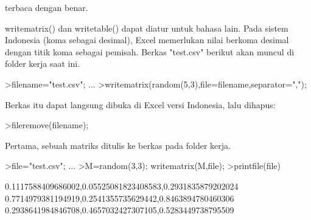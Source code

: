 \documentclass[a4paper,10pt]{article}
\begin{document}
\begin{eulernotebook}
\begin{eulercomment}
\begin{eulercomment}
\begin{eulercomment}
\begin{eulercomment}
\begin{eulercomment}
\begin{eulercomment}
\begin{eulercomment}
\begin{eulercomment}
\begin{eulercomment}
\begin{eulercomment}
\begin{eulercomment}
\begin{eulercomment}
\begin{eulercomment}
\begin{eulercomment}
\begin{eulercomment}
\begin{eulercomment}
\begin{eulercomment}
\begin{eulercomment}
\begin{eulercomment}
\begin{eulercomment}
\begin{eulercomment}
\begin{eulercomment}
\begin{eulercomment}
\begin{eulercomment}
\begin{eulercomment}
\begin{eulercomment}
\begin{eulercomment}
terbaca dengan benar.

writematrix() dan writetable() dapat diatur untuk bahasa lain. Pada sistem Indonesia (koma
sebagai desimal), Excel memerlukan nilai berkoma desimal dengan titik koma sebagai pemisah.
Berkas "test.csv" berikut akan muncul di folder kerja saat ini.
\end{eulercomment}
\begin{eulerprompt}
>filename="test.csv"; ...
>writematrix(random(5,3),file=filename,separator=",");
\end{eulerprompt}
\begin{eulercomment}
Berkas itu dapat langsung dibuka di Excel versi Indonesia, lalu dihapus:
\end{eulercomment}
\begin{eulerprompt}
>fileremove(filename);
\end{eulerprompt}
\begin{eulercomment}
\end{eulercomment}
\begin{eulercomment}
Pertama, sebuah matriks ditulis ke berkas pada folder kerja.
\end{eulercomment}
\begin{eulerprompt}
>file="test.csv";  ...
>M=random(3,3); writematrix(M,file);
>printfile(file)
\end{eulerprompt}
\begin{euleroutput}
  0.1117588409686002,0.05525081823408583,0.2931835879202024
  0.7714979381194919,0.2541355735629442,0.8463894780460306
  0.2938641984846708,0.4657032427307105,0.5283449738795509
  

\end{euleroutput}
\end{eulercomment}
\end{eulercomment}
\end{eulercomment}
\end{eulercomment}
\end{eulercomment}
\end{eulercomment}
\end{eulercomment}
\end{eulercomment}
\end{eulercomment}
\end{eulercomment}
\end{eulercomment}
\end{eulercomment}
\end{eulercomment}
\end{eulercomment}
\end{eulercomment}
\end{eulercomment}
\end{eulercomment}
\end{eulercomment}
\end{eulercomment}
\end{eulercomment}
\end{eulercomment}
\end{eulercomment}
\end{eulercomment}
\end{eulercomment}
\end{eulercomment}
\end{eulercomment}
\end{eulernotebook}
\end{document}
